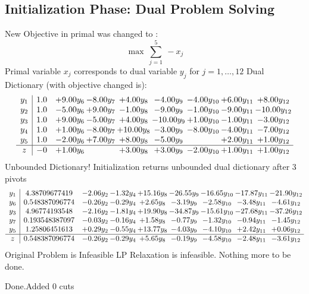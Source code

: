 \documentclass[8pt]{article}
\begin{document}
\subsection{Initialization Phase: Dual Problem Solving}
New Objective in primal was changed to : \[ \max\ \sum_{j=1}^{5}\ - x_j \] 
Primal variable $x_j$ corresponds to dual variable $y_j$ for $j = 1,\ldots,12$
Dual Dictionary (with objective changed is): 
\[\begin{array}{c| c c@{\hskip 2pt} c@{\hskip 2pt} c@{\hskip 2pt} c@{\hskip 2pt} c@{\hskip 2pt} c@{\hskip 2pt} c@{\hskip 2pt} }
 y_{1}   &  1.0 & +  9.00 y_{6} & -8.00 y_{7} & +  4.00 y_{8} & -4.00 y_{9} & -4.00 y_{10} & +  6.00 y_{11} & +  8.00 y_{12}\\
 y_{2}   &  1.0 & -5.00 y_{6} & +  9.00 y_{7} & -1.00 y_{8} & -9.00 y_{9} & -1.00 y_{10} & -9.00 y_{11} & -10.00 y_{12}\\
 y_{3}   &  1.0 & +  9.00 y_{6} & -5.00 y_{7} & +  4.00 y_{8} & -10.00 y_{9} & +  1.00 y_{10} & -1.00 y_{11} & -3.00 y_{12}\\
 y_{4}   &  1.0 & +  1.00 y_{6} & -8.00 y_{7} & + 10.00 y_{8} & -3.00 y_{9} & -8.00 y_{10} & -4.00 y_{11} & -7.00 y_{12}\\
 y_{5}   &  1.0 & -2.00 y_{6} & +  7.00 y_{7} & +  8.00 y_{8} & -5.00 y_{9} &   & +  2.00 y_{11} & +  1.00 y_{12}\\
\hline
z    &  -0 & +  1.00 y_{6} &   & +  3.00 y_{8} & +  3.00 y_{9} & -2.00 y_{10} & +  1.00 y_{11} & +  1.00 y_{12}\\
\end{array}\]
Unbounded Dictionary!
Initialization returns unbounded dual dictionary after 3 pivots
\[\begin{array}{c| c c@{\hskip 2pt} c@{\hskip 2pt} c@{\hskip 2pt} c@{\hskip 2pt} c@{\hskip 2pt} c@{\hskip 2pt} c@{\hskip 2pt} }
 y_{1}   &  4.38709677419 & -2.06 y_{2} & -1.32 y_{4} & + 15.16 y_{8} & -26.55 y_{9} & -16.65 y_{10} & -17.87 y_{11} & -21.90 y_{12}\\
 y_{6}   &  0.548387096774 & -0.26 y_{2} & -0.29 y_{4} & +  2.65 y_{8} & -3.19 y_{9} & -2.58 y_{10} & -3.48 y_{11} & -4.61 y_{12}\\
 y_{3}   &  4.96774193548 & -2.16 y_{2} & -1.81 y_{4} & + 19.90 y_{8} & -34.87 y_{9} & -15.61 y_{10} & -27.68 y_{11} & -37.26 y_{12}\\
 y_{7}   &  0.193548387097 & -0.03 y_{2} & -0.16 y_{4} & +  1.58 y_{8} & -0.77 y_{9} & -1.32 y_{10} & -0.94 y_{11} & -1.45 y_{12}\\
 y_{5}   &  1.25806451613 & +  0.29 y_{2} & -0.55 y_{4} & + 13.77 y_{8} & -4.03 y_{9} & -4.10 y_{10} & +  2.42 y_{11} & +  0.06 y_{12}\\
\hline
z    &  0.548387096774 & -0.26 y_{2} & -0.29 y_{4} & +  5.65 y_{8} & -0.19 y_{9} & -4.58 y_{10} & -2.48 y_{11} & -3.61 y_{12}\\
\end{array}\]
Original Problem is Infeasible
 LP Relaxation is infeasible. Nothing more to be done. 

Done.Added 0 cuts 
\end{document}
